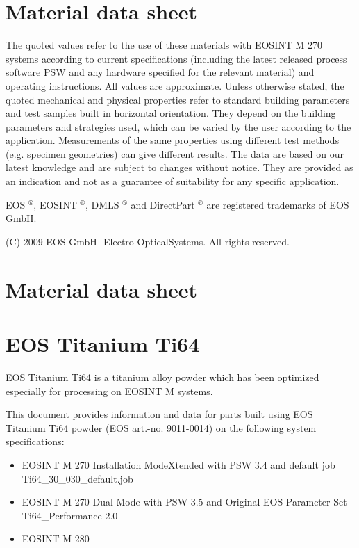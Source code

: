 \documentclass[10pt]{article}
\begin{document}
\section*{Material data sheet}
The quoted values refer to the use of these materials with EOSINT M 270 systems according to current specifications (including the latest released process software PSW and any hardware specified for the relevant material) and operating instructions. All values are approximate. Unless otherwise stated, the quoted mechanical and physical properties refer to standard building parameters and test samples built in horizontal orientation. They depend on the building parameters and strategies used, which can be varied by the user according to the application. Measurements of the same properties using different test methods (e.g. specimen geometries) can give different results. The data are based on our latest knowledge and are subject to changes without notice. They are provided as an indication and not as a guarantee of suitability for any specific application.

EOS $^{\circledR}$, EOSINT $^{\circledR}$, DMLS $^{\circledR}$ and DirectPart ${ }^{\circledR}$ are registered trademarks of EOS GmbH.

(C) 2009 EOS GmbH- Electro OpticalSystems. All rights reserved.

\section*{Material data sheet}
\section*{EOS Titanium Ti64}
EOS Titanium Ti64 is a titanium alloy powder which has been optimized especially for processing on EOSINT M systems.

This document provides information and data for parts built using EOS Titanium Ti64 powder (EOS art.-no. 9011-0014) on the following system specifications:

\begin{itemize}
  \item EOSINT M 270 Installation ModeXtended with PSW 3.4 and default job Ti64\_30\_030\_default.job
  \item EOSINT M 270 Dual Mode with PSW 3.5 and Original EOS Parameter Set Ti64\_Performance 2.0
  \item EOSINT M 280
\end{itemize}
\end{document}
